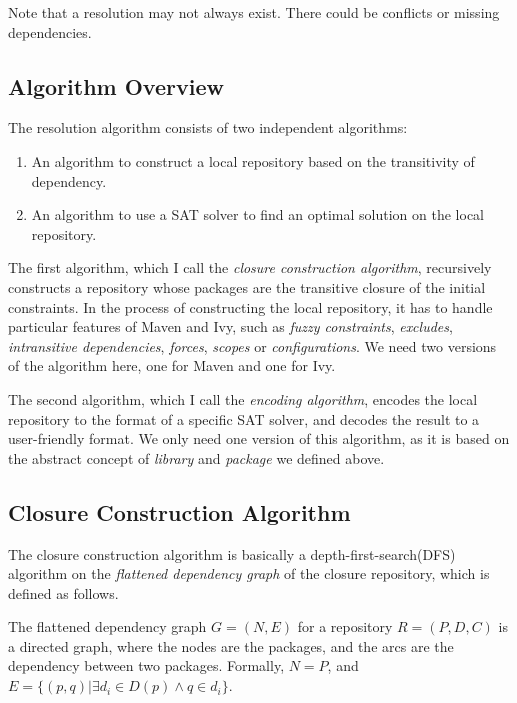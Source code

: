 Note that a resolution may not always exist. There could be conflicts or missing dependencies.

\subsection{Algorithm Overview}

The resolution algorithm consists of two independent algorithms:

\begin{enumerate}
\item An algorithm to construct a local repository based on the transitivity of dependency.
\item An algorithm to use a SAT solver to find an optimal solution on the local repository.
\end{enumerate}

The first algorithm, which I call the \emph{closure construction algorithm}, recursively constructs a repository whose packages are the transitive closure of the initial constraints. In the process of constructing the local repository, it has to handle particular features of Maven and Ivy, such as \emph{fuzzy constraints}, \emph{excludes}, \emph{intransitive dependencies}, \emph{forces}, \emph{scopes} or \emph{configurations}. We need two versions of the algorithm here, one for Maven and one for Ivy.

The second algorithm, which I call the \emph{encoding algorithm}, encodes the local repository to the format of a specific SAT solver, and decodes the result to a user-friendly format. We only need one version of this algorithm, as it is based on the abstract concept of \emph{library} and \emph{package} we defined above.

\subsection{Closure Construction Algorithm}

The closure construction algorithm is basically a depth-first-search(DFS) algorithm on the \emph{flattened dependency graph} of the closure repository, which is defined as follows.

\begin{definition}
  The flattened dependency graph $G = (N, E)$ for a repository $R = (P, D, C)$ is a directed graph, where the nodes are the packages, and the arcs are the dependency between two packages. Formally, $N = P$, and $E = \{ (p, q) | \exists d_i \in D(p) \land q \in d_i\}$.
\end{definition}

